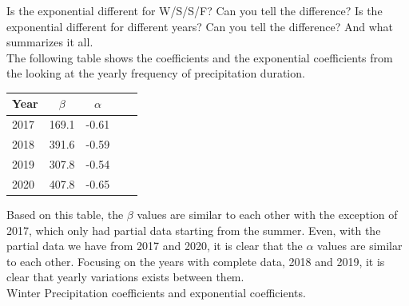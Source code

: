 \documentclass[11pt]{report}
\begin{document}
Is the exponential different for W/S/S/F? Can you tell the difference?
Is the exponential different for different years? Can you tell the difference?
And what summarizes it all. \\
The following table shows the coefficients and the exponential coefficients from the looking at the yearly frequency of precipitation duration. \\
\begin{center}
	\begin{tabular}{l*{3}{c}r}
		\centering
		Year      & $\beta $ & $\alpha$  \\
		\hline
		2017      & 169.1           & -0.61    \\
		2018      & 391.6           & -0.59    \\
		2019      & 307.8           & -0.54   \\
		2020      & 407.8           & -0.65    \\
	\end{tabular}
\end{center}
Based on this table, the $\beta$ values are similar to each other with the exception of 2017, which only had partial data starting from the summer. Even, with the partial data we have from 2017 and 2020, it is clear that the $\alpha$ values are similar to each other. Focusing on the years with complete data, 2018 and 2019, it is clear that yearly variations exists between them. 
\\
Winter Precipitation coefficients and exponential coefficients. \\
\end{document}
